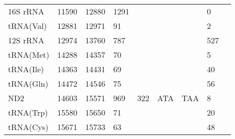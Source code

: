 \documentclass[../DISSERTACAO_MAIN.tex]{subfiles}
\begin{document}
\begin{longtable}{llllllllllllllllllllll}
			16S 				rRNA & \multicolumn{2}{l}{11590}   & \multicolumn{2}{l}{12880}   & \multicolumn{2}{l}{1291}        & \multicolumn{3}{l}{}                          & \multicolumn{3}{l}{}      & \multicolumn{3}{l}{}        & \multicolumn{3}{l}{0}           & \multicolumn{3}{l}{}         \\
			tRNA(Val)    & \multicolumn{2}{l}{12881}   & \multicolumn{2}{l}{12971}   & \multicolumn{2}{l}{91}          & \multicolumn{3}{l}{}                          & \multicolumn{3}{l}{}      & \multicolumn{3}{l}{}        & \multicolumn{3}{l}{2}           & \multicolumn{3}{l}{}         \\
			12S 				rRNA & \multicolumn{2}{l}{12974}   & \multicolumn{2}{l}{13760}   & \multicolumn{2}{l}{787}         & \multicolumn{3}{l}{}                          & \multicolumn{3}{l}{}      & \multicolumn{3}{l}{}        & \multicolumn{3}{l}{527}         & \multicolumn{3}{l}{}         \\
			tRNA(Met)    & \multicolumn{2}{l}{14288}   & \multicolumn{2}{l}{14357}   & \multicolumn{2}{l}{70}          & \multicolumn{3}{l}{}                          & \multicolumn{3}{l}{}      & \multicolumn{3}{l}{}        & \multicolumn{3}{l}{5}           & \multicolumn{3}{l}{}         \\
			tRNA(Ile)    & \multicolumn{2}{l}{14363}   & \multicolumn{2}{l}{14431}   & \multicolumn{2}{l}{69}          & \multicolumn{3}{l}{}                          & \multicolumn{3}{l}{}      & \multicolumn{3}{l}{}        & \multicolumn{3}{l}{40}          & \multicolumn{3}{l}{}         \\
			tRNA(Gln)    & \multicolumn{2}{l}{14472}   & \multicolumn{2}{l}{14546}   & \multicolumn{2}{l}{75}          & \multicolumn{3}{l}{}                          & \multicolumn{3}{l}{}      & \multicolumn{3}{l}{}        & \multicolumn{3}{l}{56}          & \multicolumn{3}{l}{}         \\
			ND2          & \multicolumn{2}{l}{14603}   & \multicolumn{2}{l}{15571}   & \multicolumn{2}{l}{969}         & \multicolumn{3}{l}{322}                       & \multicolumn{3}{l}{ATA}   & \multicolumn{3}{l}{TAA}     & \multicolumn{3}{l}{8}           & \multicolumn{3}{l}{}         \\
			tRNA(Trp)    & \multicolumn{2}{l}{15580}   & \multicolumn{2}{l}{15650}   & \multicolumn{2}{l}{71}          & \multicolumn{3}{l}{}                          & \multicolumn{3}{l}{}      & \multicolumn{3}{l}{}        & \multicolumn{3}{l}{20}          & \multicolumn{3}{l}{}         \\
			tRNA(Cys)    & \multicolumn{2}{l}{15671}   & \multicolumn{2}{l}{15733}   & \multicolumn{2}{l}{63}          & \multicolumn{3}{l}{}                          & \multicolumn{3}{l}{}      & \multicolumn{3}{l}{}        & \multicolumn{3}{l}{48}          & \multicolumn{3}{l}{}         \\

\end{longtable}
\end{document}
